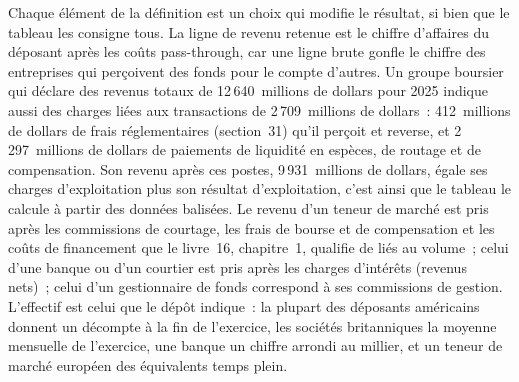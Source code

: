 Chaque élément de la définition est un choix qui modifie le résultat, si bien que le tableau les consigne tous. La ligne de revenu retenue est
le chiffre d'affaires du déposant après les coûts pass-through, car une ligne brute gonfle le chiffre des entreprises qui perçoivent des fonds pour le compte d'autres.
Un groupe boursier qui déclare des revenus totaux de 12\,640~millions de dollars pour 2025 indique aussi
des charges liées aux transactions de 2\,709~millions de dollars~: 412~millions de dollars de frais réglementaires (section~31) qu'il perçoit et reverse,
et 2\,297~millions de dollars de paiements de liquidité en espèces, de routage et de compensation. Son revenu après ces postes, 9\,931~millions de dollars, égale ses charges d'exploitation plus son résultat d'exploitation, c'est ainsi que le tableau le calcule à partir des données balisées.
Le revenu d'un teneur de marché est pris après les commissions de courtage, les frais de bourse et de compensation et
les coûts de financement que le livre~16, chapitre~1, qualifie de liés au volume~; celui d'une banque ou d'un courtier est pris après les charges d'intérêts (revenus nets)~; celui d'un gestionnaire de fonds correspond à ses commissions de gestion. L'effectif est celui que le dépôt indique~: la plupart des déposants américains donnent un décompte à
la fin de l'exercice, les sociétés britanniques la moyenne mensuelle de l'exercice,
une banque un chiffre arrondi au millier, et
un teneur de marché européen des équivalents temps plein.

